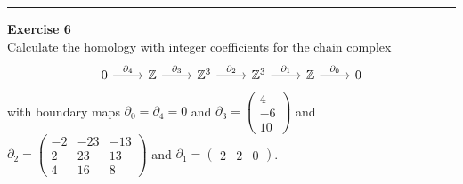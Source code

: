 \documentclass[a4paper, 11pt]{article}
\newenvironment{problem}[2][Exercise]
    { \begin{mdframed}[backgroundcolor=gray!20] \textbf{#1 #2} \\}
    {  \end{mdframed}}
\begin{document}
\noindent\rule{7in}{2.8pt}
\begin{problem}{6}
Calculate the homology with integer coefficients for the chain complex 
$$\begin{tikzcd}
	0 & {\mathbb{Z}} & {\mathbb{Z}^3} & {\mathbb{Z}^3} & {\mathbb{Z}} & 0
	\arrow["{\partial_4}", from=1-1, to=1-2]
	\arrow["{\partial_3}", from=1-2, to=1-3]
	\arrow["{\partial_2}", from=1-3, to=1-4]
	\arrow["{\partial_1}", from=1-4, to=1-5]
	\arrow["{\partial_0}", from=1-5, to=1-6]
\end{tikzcd}$$
with boundary maps \(\partial_0=\partial_4=0\) and \(\partial_3=\begin{pmatrix}
    4\\ 
    -6\\ 
    10
\end{pmatrix}\) and \(\partial_2=\begin{pmatrix}
    -2 & -23 & -13\\ 
    2  & 23 & 13\\ 
    4 & 16 & 8
\end{pmatrix}\) and \(\partial_1=\begin{pmatrix}
    2 & 2& 0
\end{pmatrix}\).
\end{problem}
\end{document}
